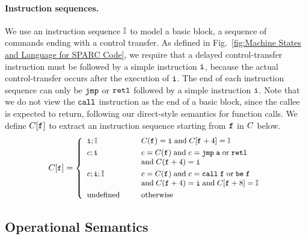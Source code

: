 \paragraph{\textbf{Instruction sequences.}}
We use an instruction sequence $\mathbb{I}$ to model
a basic block, \ie{} a sequence of commands ending
with a control transfer.
As defined in Fig.~\ref{fig:Machine States and Language for SPARC Code},
we require that a delayed control-transfer instruction
must be followed by  a simple instruction $\texttt{i}$,
because the actual control-transfer occurs after
the execution of $\texttt{i}$.
The end of each instruction sequence can only be
$\texttt{jmp}$ or $\texttt{retl}$  followed by a simple
instruction $\texttt{i}$.
Note that we do not view the $\texttt{call}$ instruction
as the end of a basic block, since the callee is
expected to return, following our direct-style
semantics for function calls.
We define $C[\texttt{f}_{}]$ to extract
an instruction sequence starting
from $\texttt{f}_{}$ in $C$ below.
\[
	\small
	C[\texttt{f}_{}] =
	\left\{
		\begin{array}{ll}
			\texttt{i}; \mathbb{I} &
			\quad \ \ C(\texttt{f}_{}) = \texttt{i} \;
				\text{and} \; C[\texttt{f}_{}+4] = \mathbb{I} \\
			
			\\[-8pt]
			
			c; \texttt{i} &
			\quad \ \
				c = C(\texttt{f}_{}) \; \text{and} \;
				c = \texttt{jmp} \; \texttt{a} \; \text{or} \; \texttt{retl}
			\\ & \quad \ \ \text{and} \; C(\texttt{f}_{}+4) = \texttt{i} \\
			
			\\[-8pt]
			
			c; \texttt{i}; \mathbb{I} &
			\quad \ \ c = C(\texttt{f}_{}) \;
			\text{and} \; c = \texttt{call} \; \texttt{f}_{} \; \text{or} \; \texttt{be} \; \texttt{f}_{} \\
			& \quad \ \ \text{and} \;
				C(\texttt{f}_{}+4) = \texttt{i} \; \text{and} \;
				C[\texttt{f}_{}+8] = \mathbb{I} \\
			
			\\[-8pt]
			
			\text{undefined} & \quad \ \ \text{otherwise}
		\end{array}
	\right.
\]

\subsection{Operational Semantics}
\label{subsec : Operational Semantics}

